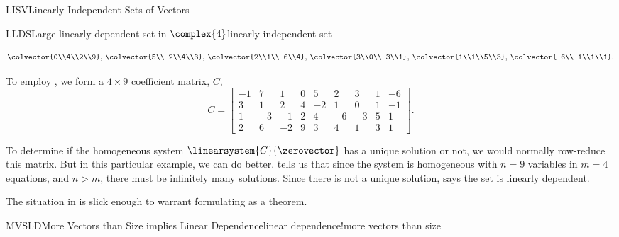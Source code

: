 \begin{subsect}{LISV}{Linearly Independent Sets of Vectors}
\begin{example}{LLDS}{Large linearly dependent set in $\complex{4}$}{linearly independent set}
\begin{para}
\begin{equation*}
{\colvector{0\\4\\2\\9},\,
\colvector{5\\-2\\4\\3},\,
\colvector{2\\1\\-6\\4},\,
\colvector{3\\0\\-3\\1},\,
\colvector{1\\1\\5\\3},\,
\colvector{-6\\-1\\1\\1}
}.
\end{equation*}
\end{para}
%
\begin{para}To employ , we form a $4\times 9$ coefficient matrix, $C$,
%
\begin{equation*}
C=
\begin{bmatrix}
-1&7&1&0&5&2&3&1&-6\\
3&1&2&4&-2&1&0&1&-1\\
1&-3&-1&2&4&-6&-3&5&1\\
2&6&-2&9&3&4&1&3&1
\end{bmatrix}.
\end{equation*}
\end{para}
%
\begin{para}To determine if the homogeneous system $\linearsystem{C}{\zerovector}$ has a unique solution or not, we would normally row-reduce this matrix.  But in this particular example, we can do better.   tells us that since the system is homogeneous with $n=9$ variables in $m=4$ equations, and $n>m$, there must be infinitely many solutions.  Since there is not a unique solution,  says the set is linearly dependent.
\end{para}
%
\end{example}
%
\begin{para}The situation in  is slick enough to warrant formulating as a theorem.
\end{para}
%
\begin{theorem}{MVSLD}{More Vectors than Size implies Linear Dependence}{linear dependence!more vectors than size}

\end{theorem}
\end{subsect}
